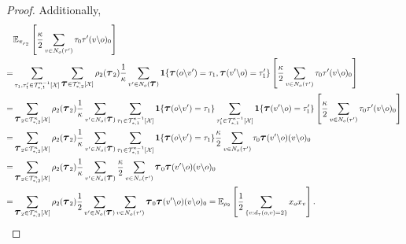 \documentclass[12pt]{article}
\newcommand{\one}[1]{\mathbf{1}\{#1\}}
\newcommand{\tree}[2]{\mathcal{T}_{*, #1}^{#2}[\mathcal{X}]}
\newcommand{\TB}{{ \boldsymbol{\scalebox{1.2}[1.2]{$\tau$}}}}
\numberwithin{equation}{section}
\begin{document}
\begin{proof}
    Additionally,
    \begin{align*}
          & \mathbb{E}_{\pi_{\rho_2}}\left[\frac\kappa 2\sum_{v\in N_o(\tau')} \tau_0\tau'(v\backslash o)_0\right]                                                                                                                                                                                                   \\
        = & \sum_{\tau_1, \tau_1'\in\tree{1}{\kappa-1}} \sum_{\TB\in \tree{2}{\kappa}} \rho_2(\TB_2)\frac1\kappa\sum_{v'\in N_o(\TB)}\one{\TB(o\backslash v') = \tau_1, \TB(v'\backslash o) = \tau_1'}\left[\frac\kappa 2\sum_{v\in N_o(\tau')} \tau_0\tau'(v\backslash o)_0\right]                                  \\
        = & \sum_{\TB_2\in \tree{2}{\kappa}} \rho_2(\TB_2) \frac1\kappa\sum_{v'\in N_o(\TB)}\sum_{\tau_1\in\tree{1}{\kappa-1}} \one{\TB(o\backslash v') = \tau_1} \sum_{\tau_1'\in\tree{1}{\kappa-1}} \one{\TB(v'\backslash o) = \tau_1'}\left[\frac\kappa 2\sum_{v\in N_o(\tau')} \tau_0\tau'(v\backslash o)_0\right] \\
        = & \sum_{\TB_2\in \tree{2}{\kappa}} \rho_2(\TB_2) \frac1\kappa\sum_{v'\in N_o(\TB)}\sum_{\tau_1\in\tree{1}{\kappa-1}} \one{\TB(o\backslash v') = \tau_1}\frac\kappa 2\sum_{v\in N_o(\tau')} \tau_0\TB(v'\backslash o)(v\backslash o)_0                                                                        \\
        = & \sum_{\TB_2\in \tree{2}{\kappa}} \rho_2(\TB_2) \frac1\kappa\sum_{v'\in N_o(\TB)} \frac\kappa 2\sum_{v\in N_o(\tau')} \TB_0\TB(v'\backslash o)(v\backslash o)_0                                                                                                                                             \\
        = & \sum_{\TB_2\in \tree{2}{\kappa}} \rho_2(\TB_2)\frac12\sum_{v'\in N_o(\TB)} \sum_{v\in N_o(\tau')} \TB_0\TB(v'\backslash o)(v\backslash o)_0
        = \mathbb{E}_{\rho_2}\left[\frac12\sum_{\{v:d_\tau(o, v)=2\}} x_o x_v\right].
    \end{align*}
\end{proof}
\end{document}
